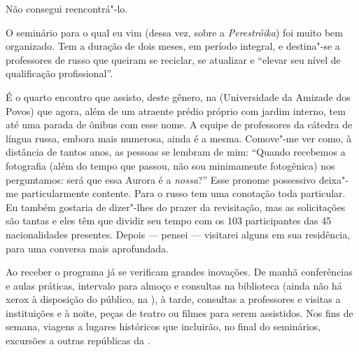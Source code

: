 Não consegui reencontrá"-lo.

O seminário para o qual eu vim (dessa vez, sobre a \emph{Perestróika})
foi muito bem organizado. Tem a duração de dois meses, em período
integral, e destina"-se a professores de russo que queiram se reciclar,
se atualizar e ``elevar seu nível de qualificação profissional''.

É o quarto encontro que assisto, deste gênero, na  (Universidade da
Amizade dos Povos) que agora, além de um atraente prédio próprio com
jardim interno, tem até uma parada de ônibus com esse nome. A equipe de
professores da cátedra de língua russa, embora mais numerosa, ainda é a
mesma. Comove"-me ver como, à distância de tantos anos, as pessoas se
lembram de mim: ``Quando recebemos a fotografia (além do tempo que
passou, não sou minimamente fotogênica) nos perguntamos: será que essa
Aurora é a \emph{nossa}?'' Esse pronome possessivo deixa"-me
particularmente contente. Para o russo tem uma conotação toda
particular. Eu também gostaria de dizer"-lhes do prazer da revisitação,
mas as solicitações são tantas e eles têm que dividir seu tempo com os
103 participantes das 45 nacionalidades presentes. Depois --- pensei ---
visitarei alguns em sua residência, para uma conversa mais aprofundada.

Ao receber o programa já se verificam grandes inovações. De manhã
conferências e aulas práticas, intervalo para almoço e consultas na
biblioteca (ainda não há xerox à disposição do público, na ), à
tarde, consultas a professores e visitas a instituições e à noite, peças
de teatro ou filmes para serem assistidos. Nos fins de semana, viagens a
lugares históricos que incluirão, no final do seminários, excursões a
outras repúblicas da .


